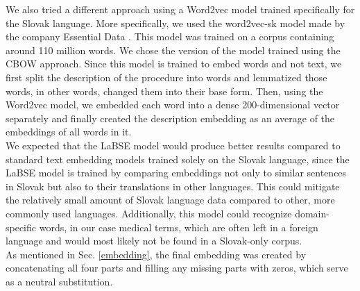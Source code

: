 We also tried a different approach using a Word2vec model trained specifically for the Slovak language. More specifically, we used the word2vec-sk model made by the company Essential Data \cite{w2v}. This model was trained on a corpus containing around 110 million words. We chose the version of the model trained using the CBOW approach. Since this model is trained to embed words and not text, we first split the description of the procedure into words and lemmatized those words, in other words, changed them into their base form. Then, using the Word2vec model, we embedded each word into a dense 200-dimensional vector separately and finally created the description embedding as an average of the embeddings of all words in it.
\\

We expected that the LaBSE model would produce better results compared to standard text embedding models trained solely on the Slovak language, since the LaBSE model is trained by comparing embeddings not only to similar sentences in Slovak but also to their translations in other languages. This could mitigate the relatively small amount of Slovak language data compared to other, more commonly used languages. Additionally, this model could recognize domain-specific words, in our case medical terms, which are often left in a foreign language and would most likely not be found in a Slovak-only corpus.
\\

As mentioned in Sec. \ref{embedding}, the final embedding was created by concatenating all four parts and filling any missing parts with zeros, which serve as a neutral substitution.
